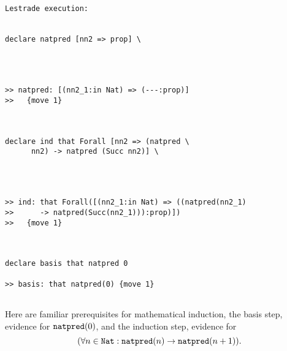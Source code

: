 \documentclass[12pt]{article}
\begin{document}
\begin{verbatim}Lestrade execution:


declare natpred [nn2 => prop] \
   



>> natpred: [(nn2_1:in Nat) => (---:prop)]
>>   {move 1}



declare ind that Forall [nn2 => (natpred \
      nn2) -> natpred (Succ nn2)] \
   



>> ind: that Forall([(nn2_1:in Nat) => ((natpred(nn2_1)
>>      -> natpred(Succ(nn2_1))):prop)])
>>   {move 1}



declare basis that natpred 0

>> basis: that natpred(0) {move 1}


\end{verbatim}

Here are familiar prerequisites for mathematical induction, the basis step, evidence for ${\tt natpred}(0)$, and the induction step, evidence for $$(\forall n \in {\tt Nat}:{\tt natpred}(n) \rightarrow {\tt natpred}(n+1) ).$$
\end{document}
